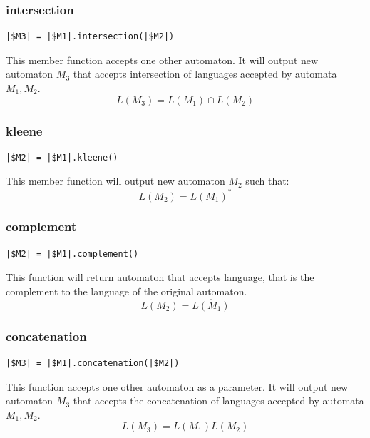 \documentclass{ctuthesis}
\begin{document}
\subsubsection{intersection}
\begin{lstlisting}[language = JASL_snippet]
	|$M3| = |$M1|.intersection(|$M2|)
\end{lstlisting}

This member function accepts one other automaton. It will output new automaton $M_3$ that accepts intersection of languages accepted by automata $M_1, M_2$.
\begin{equation*}
	L(M_3) = L(M_1) \cap L(M_2)
\end{equation*}

\subsubsection{kleene}
\begin{lstlisting}[language = JASL_snippet]
	|$M2| = |$M1|.kleene()
\end{lstlisting}

This member function will output new automaton $M_2$ such that:
\begin{equation*}
	L(M_2) = L(M_1)^*
\end{equation*}

\subsubsection{complement}
\begin{lstlisting}[language = JASL_snippet]
	|$M2| = |$M1|.complement()
\end{lstlisting}

This function will return automaton that accepts language, that is the complement to the language of the original automaton.
\begin{equation*}
	L(M_2) = \overline{L(M_1)}
\end{equation*}

\subsubsection{concatenation}
\begin{lstlisting}[language = JASL_snippet]
	|$M3| = |$M1|.concatenation(|$M2|)
\end{lstlisting}

This function accepts one other automaton as a parameter. It will output new automaton $M_3$ that accepts the concatenation of languages accepted by automata $M_1, M_2$.
\begin{equation*}
	L(M_3) = L(M_1)L(M_2)
\end{equation*}
\end{document}
